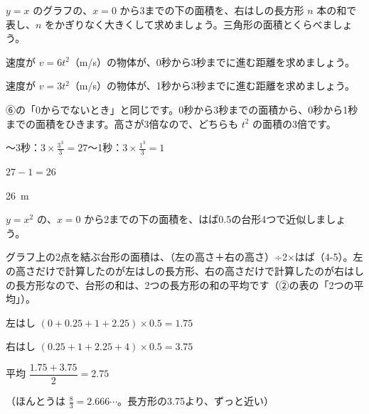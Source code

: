 \noindent\begin{minipage}[t]{0.485\linewidth}\vspace{0pt}\raggedright
\begin{jibun}
$y=x$ のグラフの、$x=0$ から3までの下の面積を、右はしの長方形 $n$ 本の和で表し、$n$ をかぎりなく大きくして求めましょう。三角形の面積とくらべましょう。
\end{jibun}
\end{minipage}\hfill
\begin{minipage}[t]{0.485\linewidth}\vspace{0pt}\raggedright
\begin{jibun}
速度が $v=6t^2$（m/s）の物体が、0秒から3秒までに進む距離を求めましょう。
\end{jibun}
\end{minipage}

\begin{reidai}
速度が $v=3t^2$（m/s）の物体が、1秒から3秒までに進む距離を求めましょう。\par
\kangaekata ⑥の「0からでないとき」と同じです。0秒から3秒までの面積から、0秒から1秒までの面積をひきます。高さが3倍なので、どちらも $t^2$ の面積の3倍です。\par
{}〜3秒：$\displaystyle3\times\frac{3^3}{3}=27$〜1秒：$\displaystyle3\times\frac{1^3}{3}=1$\par
\hspace*{2.6\zw}$27-1=26$\par
\kotae \qty{26}{m}
\end{reidai}

\begin{reidai}[台形で近似する]
$y=x^2$ の、$x=0$ から2までの下の面積を、はば0.5の台形4つで近似しましょう。\par
\kangaekata グラフ上の2点を結ぶ台形の面積は、（左の高さ＋右の高さ）÷2×はば（4-5）。左の高さだけで計算したのが左はしの長方形、右の高さだけで計算したのが右はしの長方形なので、台形の和は、2つの長方形の和の平均です（②の表の「2つの平均」）。\par
\shiki 左はし $(0+0.25+1+2.25)\times0.5=1.75$\par
\hspace*{2.6\zw}右はし $(0.25+1+2.25+4)\times0.5=3.75$\par
\hspace*{2.6\zw}平均 $\dfrac{1.75+3.75}{2}=2.75$\par
{}（ほんとうは $\frac{8}{3}=2.666\cdots$。長方形の3.75より、ずっと近い）
\end{reidai}

